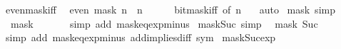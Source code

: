 \begin{isabellebody}
\endisatagproof
{\isafoldproof}%
%
\isadelimproof
\isanewline
%
\endisadelimproof
\isanewline
{}\isamarkupfalse%
\ even{\isacharunderscore}{\kern0pt}mask{\isacharunderscore}{\kern0pt}iff{\isacharcolon}{\kern0pt}\isanewline
\ \ {\isacartoucheopen}even\ {\isacharparenleft}{\kern0pt}mask\ n{\isacharparenright}{\kern0pt}\ {\isasymlongleftrightarrow}\ n\ {\isacharequal}{\kern0pt}\ {}{\isacartoucheclose}\isanewline
%
\isadelimproof
\ \ %
\endisadelimproof
%
\isatagproof
{}\isamarkupfalse%
\ bit{\isacharunderscore}{\kern0pt}mask{\isacharunderscore}{\kern0pt}iff\ {\isacharbrackleft}{\kern0pt}of\ n\ {}{\isacharbrackright}{\kern0pt}\ \isamarkupfalse%
\ auto%
\endisatagproof
{\isafoldproof}%
%
\isadelimproof
\isanewline
%
\endisadelimproof
\isanewline
{}\isamarkupfalse%
\ mask{\isacharunderscore}{\kern0pt}{}\ {\isacharbrackleft}{\kern0pt}simp{\isacharbrackright}{\kern0pt}{\isacharcolon}{\kern0pt}\isanewline
\ \ {\isacartoucheopen}mask\ {}\ {\isacharequal}{\kern0pt}\ {}{\isacartoucheclose}\isanewline
%
\isadelimproof
\ \ %
\endisadelimproof
%
\isatagproof
{}\isamarkupfalse%
\ {\isacharparenleft}{\kern0pt}simp\ add{\isacharcolon}{\kern0pt}\ mask{\isacharunderscore}{\kern0pt}eq{\isacharunderscore}{\kern0pt}exp{\isacharunderscore}{\kern0pt}minus{\isacharunderscore}{\kern0pt}{}{\isacharparenright}{\kern0pt}%
\endisatagproof
{\isafoldproof}%
%
\isadelimproof
\isanewline
%
\endisadelimproof
\isanewline
{}\isamarkupfalse%
\ mask{\isacharunderscore}{\kern0pt}Suc{\isacharunderscore}{\kern0pt}{}\ {\isacharbrackleft}{\kern0pt}simp{\isacharbrackright}{\kern0pt}{\isacharcolon}{\kern0pt}\isanewline
\ \ {\isacartoucheopen}mask\ {\isacharparenleft}{\kern0pt}Suc\ {}{\isacharparenright}{\kern0pt}\ {\isacharequal}{\kern0pt}\ {}{\isacartoucheclose}\isanewline
%
\isadelimproof
\ \ %
\endisadelimproof
%
\isatagproof
{}\isamarkupfalse%
\ {\isacharparenleft}{\kern0pt}simp\ add{\isacharcolon}{\kern0pt}\ mask{\isacharunderscore}{\kern0pt}eq{\isacharunderscore}{\kern0pt}exp{\isacharunderscore}{\kern0pt}minus{\isacharunderscore}{\kern0pt}{}\ add{\isacharunderscore}{\kern0pt}implies{\isacharunderscore}{\kern0pt}diff\ sym{\isacharparenright}{\kern0pt}%
\endisatagproof
{\isafoldproof}%
%
\isadelimproof
\isanewline
%
\endisadelimproof
\isanewline
{}\isamarkupfalse%
\ mask{\isacharunderscore}{\kern0pt}Suc{\isacharunderscore}{\kern0pt}exp{\isacharcolon}{\kern0pt}\isanewline

\end{isabellebody}
